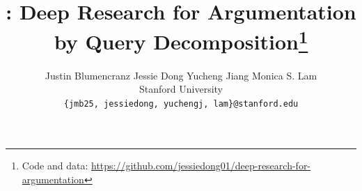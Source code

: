 \documentclass{article}
\title{\sys{}: Deep Research for Argumentation\\by Query Decomposition\thanks{Code and data: \url{https://github.com/jessiedong01/deep-research-for-argumentation}}}
\author{Justin Blumencranz \quad Jessie Dong \quad Yucheng Jiang \quad Monica S. Lam \\
Stanford University \\
\texttt{\{jmb25, jessiedong, yuchengj, lam\}@stanford.edu}
}
\begin{document}
\maketitle
\lhead{}
\renewcommand{\footrulewidth}{1.5pt}

\begin{abstract}

\end{abstract}















\clearpage
\appendix

\end{document}
